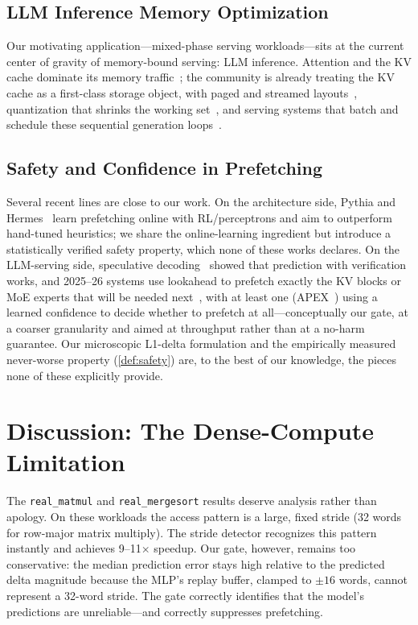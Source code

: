 \documentclass[conference]{IEEEtran}
\begin{document}
\subsection{LLM Inference Memory Optimization}

Our motivating application---mixed-phase serving workloads---sits at the current center
of gravity of memory-bound serving: LLM inference. Attention and the KV cache dominate
its memory traffic~\cite{pope2023,kwon2023vllm}; the community is already treating the
KV cache as a first-class storage object, with paged and streamed
layouts~\cite{kwon2023vllm,kvcache_streamed}, quantization that shrinks the working
set~\cite{kvcache_quant}, and serving systems that batch and schedule these sequential
generation loops~\cite{orca,sarathi}.

\subsection{Safety and Confidence in Prefetching}

Several recent lines are close to our work. On the architecture side, Pythia and
Hermes~\cite{pythia} learn prefetching online with RL/perceptrons and aim to outperform
hand-tuned heuristics; we share the online-learning ingredient but introduce a
statistically verified safety property, which none of these works declares. On the
LLM-serving side, speculative decoding~\cite{leviathan2023} showed that prediction
with verification works, and 2025--26 systems use lookahead to prefetch exactly the
KV blocks or MoE experts that will be needed
next~\cite{kvcache_lookahead,apex,kvcache_moe}, with at least one
(APEX~\cite{apex}) using a learned confidence to decide whether to prefetch at
all---conceptually our gate, at a coarser granularity and aimed at throughput rather
than at a no-harm guarantee. Our microscopic L1-delta formulation and the empirically measured
never-worse property (\cref{def:safety}) are, to the best of our knowledge, the
pieces none of these explicitly provide.

\section{Discussion: The Dense-Compute Limitation}
\label{sec:discussion}

The \texttt{real\_matmul} and \texttt{real\_mergesort} results deserve analysis rather
than apology. On these workloads the access pattern is a large, fixed stride (32 words
for row-major matrix multiply). The stride detector recognizes this pattern
instantly and achieves 9--11$\times$ speedup. Our gate, however, remains too
conservative: the median prediction error stays high relative to the predicted delta
magnitude because the MLP's replay buffer, clamped to ${\pm}16$ words, cannot
represent a 32-word stride. The gate correctly identifies that the model's predictions
are unreliable---and correctly suppresses prefetching.
\end{document}
